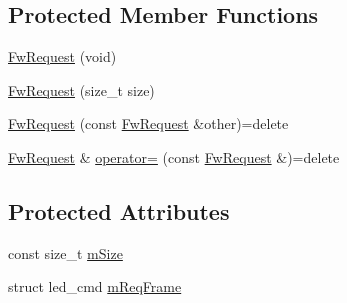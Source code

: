 \subsection*{Protected Member Functions}
\begin{DoxyCompactItemize}
\item 
\hyperlink{class_fw_request_a88bfea04ae73054dc6e53fe05c36bc5e}{Fw\-Request} (void)
\item 
\hyperlink{class_fw_request_a37f28e3c9062fa8f455b6f6bf4f046bd}{Fw\-Request} (size\-\_\-t size)
\item 
\hyperlink{class_fw_request_afcd9003a7d5410ff12cc20529b2f8063}{Fw\-Request} (const \hyperlink{class_fw_request}{Fw\-Request} \&other)=delete
\item 
\hyperlink{class_fw_request}{Fw\-Request} \& \hyperlink{class_fw_request_a75cd660d38a4e5536abc21d3308edec9}{operator=} (const \hyperlink{class_fw_request}{Fw\-Request} \&)=delete
\end{DoxyCompactItemize}
\subsection*{Protected Attributes}
\begin{DoxyCompactItemize}
\item 
const size\-\_\-t \hyperlink{class_fw_request_a5f44d41f56901e8b61ee9390c0af8eca}{m\-Size}
\item 
struct led\-\_\-cmd \hyperlink{class_fw_request_a1aefbfbc115ce21f8816c8a458108263}{m\-Req\-Frame}
\end{DoxyCompactItemize}


